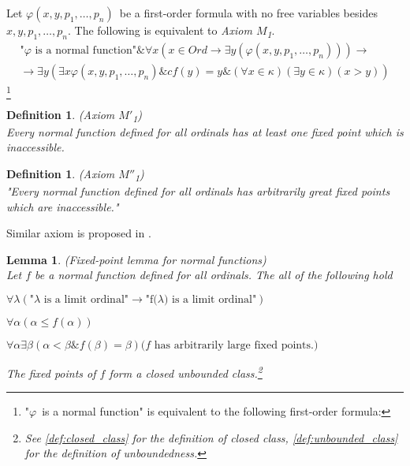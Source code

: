 \documentclass[12pt,a4paper]{article}
\newtheorem{definition}[theorem]{Definition}
\newtheorem{lemma}[theorem]{Lemma}
\newcommand{\then}{\rightarrow}
\newcommand{\bce}{\begin{compactenum}}
\newcommand{\ece}{\end{compactenum}}
\newcommand{\et}{\mathrel{\&}}
\begin{document}
Let $\varphi(x, y, p_1, \ldots, p_n)$ be a first-order formula with no free variables besides $x, y, p_1, \ldots, p_n$. The following is equivalent to \emph{Axiom $M$\textsubscript{1}}.
\begin{equation}
\begin{gathered}
\mbox{"$\varphi$ is a normal function"} \et \forall x (x \in Ord \then \exists y(\varphi(x, y, p_1, \ldots, p_n))) \then\\
\then \exists y (\exists x \varphi(x, y, p_1, \ldots, p_n) \et cf(y) = y \et (\forall x \in \kappa)(\exists y \in \kappa)(x > y))
\end{gathered}
\end{equation}\footnote{"$\varphi$ is a normal function" is equivalent to the following first-order formula: }

\begin{definition}{(Axiom $M'$\textsubscript{1})}\\
Every normal function defined for all ordinals has at least one fixed point which is inaccessible.
\end{definition}

\begin{definition}{(Axiom $M''$\textsubscript{1})}\\
"Every normal function defined for all ordinals has arbitrarily great fixed points which are inaccessible."
\end{definition}

Similar axiom is proposed in \cite{DrakeBook}.

\begin{lemma}{(Fixed-point lemma for normal functions)}\label{lemma:normal_fixed_point}\\
Let $f$ be a normal function defined for all ordinals. The all of the following hold
\bce[(i)]
\item $\forall \lambda(\mbox{"$\lambda$ is a limit ordinal"} \then \mbox{"f($\lambda$) is a limit ordinal"})$
\item $\forall \alpha (\alpha \leq f(\alpha))$
\item $\forall \alpha \exists \beta (\alpha < \beta \et f(\beta) = \beta) \mbox{($f$ has arbitrarily large fixed points.)}$
\item The fixed points of $f$ form a closed unbounded class.\footnote{See \ref{def:closed_class} for the definition of closed class, \ref{def:unbounded_class} for the definition of unboundedness.}
\ece
\end{lemma}
\end{document}
